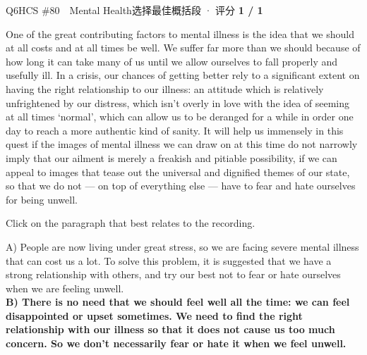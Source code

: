 \begin{qblock}{Q6\quad HCS \#80\ \ Mental Health}{选择最佳概括段 · 评分 \textcolor{cAccent}{\bfseries 1 / 1}}
\begin{promptbox}
One of the great contributing factors to mental illness is the idea that we should at all costs and at all times be well. We suffer far more than we should because of how long it can take many of us until we allow ourselves to fall properly and usefully ill. In a crisis, our chances of getting better rely to a significant extent on having the right relationship to our illness: an attitude which is relatively unfrightened by our distress, which isn't overly in love with the idea of seeming at all times `normal', which can allow us to be deranged for a while in order one day to reach a more authentic kind of sanity. It will help us immensely in this quest if the images of mental illness we can draw on at this time do not narrowly imply that our ailment is merely a freakish and pitiable possibility, if we can appeal to images that tease out the universal and dignified themes of our state, so that we do not --- on top of everything else --- have to fear and hate ourselves for being unwell.
\end{promptbox}
\begin{notebox}Click on the paragraph that best relates to the recording.\end{notebox}
{\small
A) People are now living under great stress, so we are facing severe mental illness that can cost us a lot. To solve this problem, it is suggested that we have a strong relationship with others, and try our best not to fear or hate ourselves when we are feeling unwell.\\
{\color{cFix}\textbf{B) There is no need that we should feel well all the time: we can feel disappointed or upset sometimes. We need to find the right relationship with our illness so that it does not cause us too much concern. So we don't necessarily fear or hate it when we feel unwell.}}\\
}
\end{qblock}

